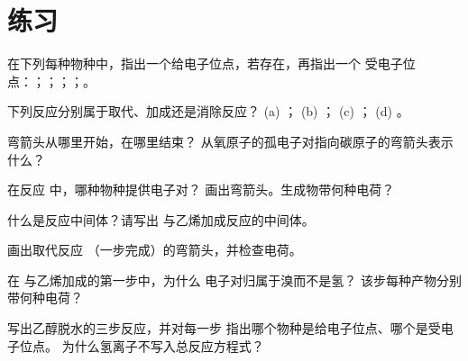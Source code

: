 \section{练习}

\begin{exercise}[$\star$]\label{exo:g12:curly-arrows:1}
在下列每种物种中，指出一个给电子位点，若存在，再指出一个
受电子位点：；；；；。
\end{exercise}

\begin{exercise}[$\star$]\label{exo:g12:curly-arrows:2}
下列反应分别属于取代、加成还是消除反应？
(a) ；
(b) ；
(c) ；
(d) 。
\end{exercise}

\begin{exercise}[$\star$]\label{exo:g12:curly-arrows:3}
弯箭头从哪里开始，在哪里结束？
从氧原子的孤电子对指向碳原子的弯箭头表示什么？
\end{exercise}

\begin{exercise}[$\star$]\label{exo:g12:curly-arrows:4}
在反应  中，哪种物种提供电子对？
画出弯箭头。生成物带何种电荷？
\end{exercise}

\begin{exercise}[$\star$]\label{exo:g12:curly-arrows:5}
什么是反应中间体？请写出
 与乙烯加成反应的中间体。
\end{exercise}

\begin{exercise}[$\star\star$]\label{exo:g12:curly-arrows:6}
画出取代反应
（一步完成）的弯箭头，并检查电荷。
\end{exercise}

\begin{exercise}[$\star\star$]\label{exo:g12:curly-arrows:7}
在  与乙烯加成的第一步中，为什么
 电子对归属于溴而不是氢？
该步每种产物分别带何种电荷？
\end{exercise}

\begin{exercise}[$\star\star$]\label{exo:g12:curly-arrows:8}
写出乙醇脱水的三步反应，并对每一步
指出哪个物种是给电子位点、哪个是受电子位点。
为什么氢离子不写入总反应方程式？
\end{exercise}

